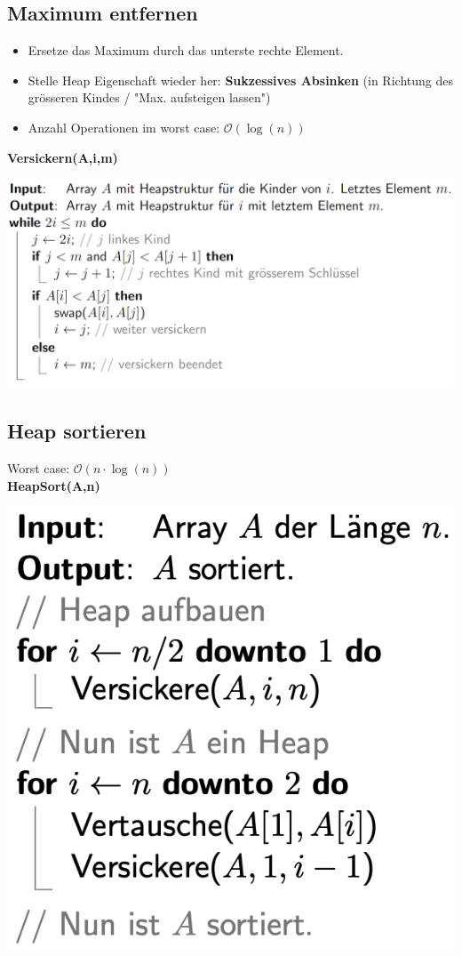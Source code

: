 \begin{sectionbox}
\subsection{Maximum entfernen}\smallskip
\begin{itemize}
    \item Ersetze das Maximum durch das unterste rechte Element.
    \item Stelle Heap Eigenschaft wieder her: \textbf{Sukzessives Absinken} (in Richtung des grösseren Kindes / "Max. aufsteigen lassen")
    \item Anzahl Operationen im worst case: $\mathcal{O}(\operatorname{log}(n))$
\end{itemize}\smallskip
\textbf{Versickern(A,i,m)}\par
\includegraphics[width = \columnwidth]{../img/Versickern.png}
\end{sectionbox}
\vspace{-4pt}
\begin{sectionbox}
\subsection{Heap sortieren}\smallskip
Worst case: $\mathcal{O}(n \cdot \operatorname{log}(n))$\\
\textbf{HeapSort(A,n)}\par
\includegraphics[width = 0.45 \columnwidth]{../img/HeapSort.png}
\end{sectionbox}


